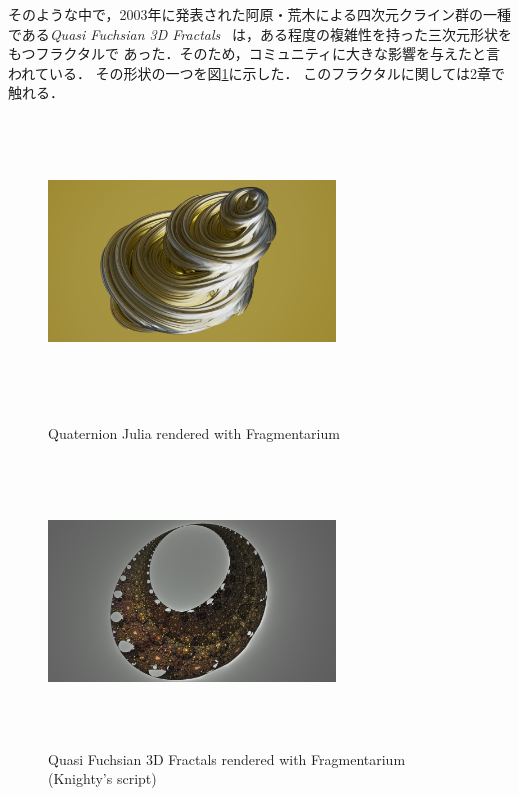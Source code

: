 そのような中で，2003年に発表された阿原・荒木による四次元クライン群の一種
である\textit{Quasi Fuchsian 3D Fractals}~\cite{ahara2003sphairahedral}
は，ある程度の複雑性を持った三次元形状をもつフラクタルで
あった．そのため，コミュニティに大きな影響を与えたと言われている．
その形状の一つを図\ref{fig:quasi-fuchsian-3d}に示した．
このフラクタルに関しては2章で触れる．

\begin{figure}[htbp]
  \begin{minipage}[t]{0.49\hsize}
   \center
   \includegraphics[width=3in, height=3in, keepaspectratio]{../img/fractal/qjulia.pdf}
   \caption{Quaternion Julia rendered with Fragmentarium}
   \label{fig:qjulia}
  \end{minipage}
 \begin{minipage}[t]{0.49\hsize}
  \center
  \includegraphics[width=3in, height=3in, keepaspectratio]{../img/fractal/quasi-fuchsian.pdf}
  \caption{Quasi Fuchsian 3D Fractals rendered with Fragmentarium
  (Knighty's script)}
  \label{fig:quasi-fuchsian-3d}
 \end{minipage}
\end{figure}

